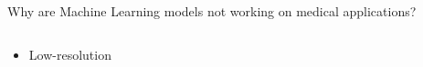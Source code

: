 \documentclass[8pt,xcolor=table,aspectratio=169]{beamer}
\begin{document}
\begin{frame}{Why are Machine Learning models not working on medical applications?}
\begin{columns}[t]
\begin{column}{0.5\textwidth}
\begin{itemize}
 \item Low-resolution

 \begin{center}
\end{center}



% 


\end{itemize}


\end{column}
\end{columns}

 
 
\end{frame}

\newcommand{\diagfld}{brgm_diagram}
\newcommand{\fstikz}[1]{\footnotesize{#1}}

\newcommand{\dgs}{0.85}
\end{document}
